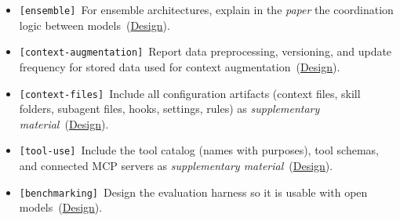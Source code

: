 \documentclass[smallextended]{svjour3}
\makeatletter
\newcommand{\must}{\textbf{must}\xspace}
\newcommand{\should}{\textbf{should}\xspace}
\newcommand{\paper}{\emph{paper}\xspace}
\newcommand{\supplementarymaterial}{\emph{supplementary material}\xspace}
\newcommand{\paper}{\emph{paper}\xspace}
\newcommand{\supplementarymaterial}{\emph{supplementary material}\xspace}
\newcommand{\iconS}{\usebox{\iconSbox}\xspace}
\newcommand{\iconS}{○\xspace}
\newcommand{\condition}[1]{\texttt{\small[#1]}\,}
\newcommand{\condition}[1]{@@cond:#1@@}
\newcommand{\openllm}{\hyperref[sec:use-an-open-llm-as-a-baseline]{\mbox{\emph{Open LLM}}}\xspace}
\newcommand{\refdesign}{\hyperref[sec:report-system-and-prompt-design]{Design}}
\newcommand{\openllm}{\href{/guidelines/open-llm/}{\emph{Open LLM}}\xspace}
\newcommand{\refdesign}{\href{/guidelines/design/}{Design}}
\makeatother
\begin{document}
\begin{appendices}
\begin{itemize}[label={},leftmargin=*]
    \item \iconS \condition{ensemble} For ensemble architectures, explain in the \paper the coordination logic between models~(\refdesign).
    \item \iconS \condition{context-augmentation} Report data preprocessing, versioning, and update frequency for stored data used for context augmentation~(\refdesign).
    \item \iconS \condition{context-files} Include all configuration artifacts (context files, skill folders, subagent files, hooks, settings, rules) as \supplementarymaterial~(\refdesign).
    \item \iconS \condition{tool-use} Include the tool catalog (names with purposes), tool schemas, and connected MCP servers as \supplementarymaterial~(\refdesign).
    \item \iconS \condition{benchmarking} Design the evaluation harness so it is usable with open models~(\refdesign).
\end{itemize}


\end{appendices}
\end{document}

